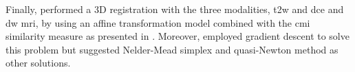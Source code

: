 Finally, \cite{Viswanath2011} performed a 3D registration with the three modalities, \ac{t2w} and \ac{dce} and \ac{dw} \ac{mri}, by using an affine transformation model combined with the \ac{cmi} similarity measure as presented in \cite{Chappelow2011}. Moreover, \cite{Chappelow2011} employed gradient descent to solve this problem but suggested Nelder-Mead simplex and quasi-Newton method as other solutions.

